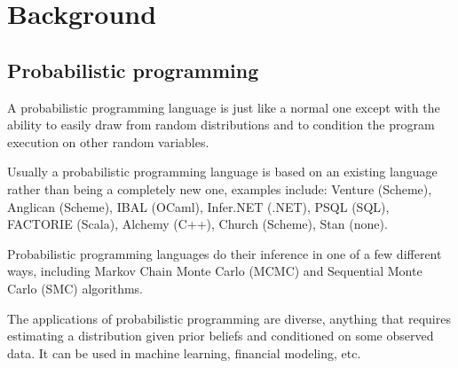 \documentclass[a4paper]{article}
\begin{document}

\section{Background}




\subsection{Probabilistic programming}

A probabilistic programming language is just like a normal one except with the ability to easily draw from random distributions and to condition the program execution on other random variables.

Usually a probabilistic programming language is based on an existing language rather than being a completely new one, examples include: Venture (Scheme), Anglican (Scheme), IBAL (OCaml), Infer.NET (.NET), PSQL (SQL), FACTORIE (Scala), Alchemy (C++), Church (Scheme), Stan (none).

Probabilistic programming languages do their inference in one of a few different ways, including Markov Chain Monte Carlo (MCMC) and Sequential Monte Carlo (SMC) algorithms.

The applications of probabilistic programming are diverse, anything that requires estimating a distribution given prior beliefs and conditioned on some observed data. It can be used in machine learning, financial modeling, etc.



\end{document}
